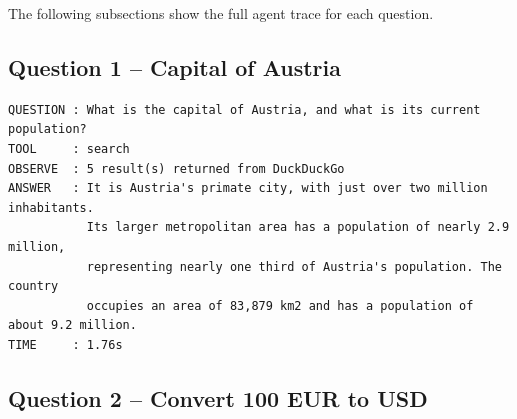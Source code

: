 \documentclass[11pt,a4paper]{article}
\begin{document}
\begin{table}[H]
\centering
\caption{Agent performance on all 7 example questions}
\label{tab:summary}
\end{table}

The following subsections show the full agent trace for each question.

\subsection{Question 1 -- Capital of Austria}

\begin{lstlisting}
QUESTION : What is the capital of Austria, and what is its current population?
TOOL     : search
OBSERVE  : 5 result(s) returned from DuckDuckGo
ANSWER   : It is Austria's primate city, with just over two million inhabitants.
           Its larger metropolitan area has a population of nearly 2.9 million,
           representing nearly one third of Austria's population. The country
           occupies an area of 83,879 km2 and has a population of about 9.2 million.
TIME     : 1.76s
\end{lstlisting}

\subsection{Question 2 -- Convert 100 EUR to USD}
\end{document}
